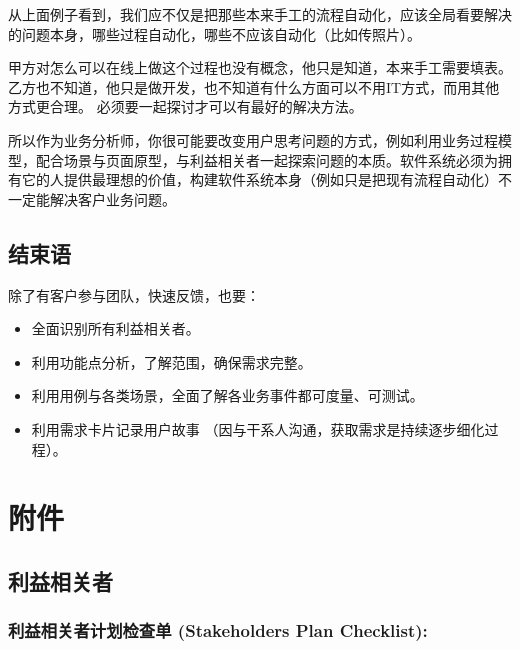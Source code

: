 从上面例子看到，我们应不仅是把那些本来手工的流程自动化，应该全局看要解决的问题本身，哪些过程自动化，哪些不应该自动化（比如传照片）。

甲方对怎么可以在线上做这个过程也没有概念，他只是知道，本来手工需要填表。
乙方也不知道，他只是做开发，也不知道有什么方面可以不用IT方式，而用其他方式更合理。
必须要一起探讨才可以有最好的解决方法。

所以作为业务分析师，你很可能要改变用户思考问题的方式，例如利用业务过程模型，配合场景与页面原型，与利益相关者一起探索问题的本质。软件系统必须为拥有它的人提供最理想的价值，构建软件系统本身（例如只是把现有流程自动化）不一定能解决客户业务问题。

\hypertarget{ux5e38ux89c1ux95eeux9898}{%
\subsection{结束语}\label{ux5e38ux89c1ux95eeux9898}}

除了有客户参与团队，快速反馈，也要：

\begin{itemize}
\tightlist
\item
  全面识别所有利益相关者。
\item
  利用功能点分析，了解范围，确保需求完整。
\item
  利用用例与各类场景，全面了解各业务事件都可度量、可测试。
\item
  利用需求卡片记录用户故事
  （因与干系人沟通，获取需求是持续逐步细化过程）。
\end{itemize}

\hypertarget{ux9644ux4ef6}{%
\section{附件}\label{ux9644ux4ef6}}

\hypertarget{ux5229ux76caux76f8ux5173ux8005}{%
\subsection{利益相关者}\label{ux5229ux76caux76f8ux5173ux8005}}

\hypertarget{ux5229ux76caux76f8ux5173ux8005ux8ba1ux5212ux68c0ux67e5ux5355-stakeholders-plan-checklist}{%
\subsubsection{利益相关者计划检查单 (Stakeholders Plan
Checklist):}\label{ux5229ux76caux76f8ux5173ux8005ux8ba1ux5212ux68c0ux67e5ux5355-stakeholders-plan-checklist}}

